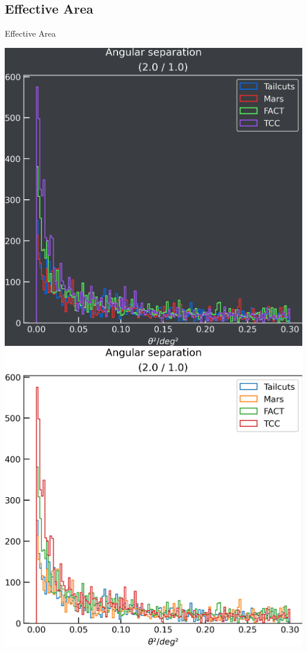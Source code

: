 \subsection{Effective Area}
\begin{frame}{Effective Area}
  \begin{minipage}{0.32\textwidth}
    \ifdefined\darktheme
      \centering
      \includegraphics[width=\textwidth]{plots/ang_sep/ang_sep__2.0_1.0_dark.png}
    \else
      \centering
      \includegraphics[width=\textwidth]{plots/ang_sep/ang_sep__2.0_1.0_light.png}

\end{minipage}
\end{frame}
